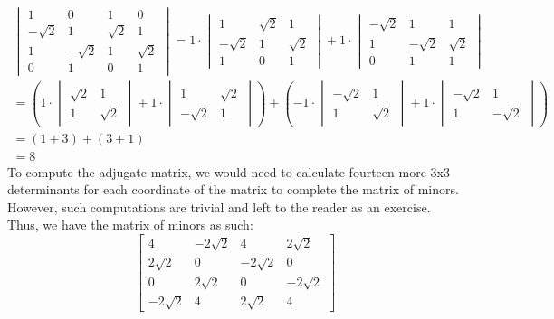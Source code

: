 \documentclass{article}
\theoremstyle{definition}
\begin{document}
\[
\begin{gathered}
\begin{vmatrix}
    1 & 0 & 1 & 0\\
    -\sqrt{2} & 1 & \sqrt{2} & 1\\
    1 & -\sqrt{2} & 1 & \sqrt{2}\\
    0 & 1 & 0 & 1
\end{vmatrix}
= 1\cdot
\begin{vmatrix}
    1 & \sqrt{2} & 1\\
    -\sqrt{2} & 1 & \sqrt{2}\\
    1 & 0 & 1
\end{vmatrix} + 1\cdot
\begin{vmatrix}
    -\sqrt{2} & 1 & 1\\
    1 & -\sqrt{2} &\sqrt{2}\\
    0 & 1 & 1
\end{vmatrix}\\
= \left(1 \cdot \begin{vmatrix}
    \sqrt{2} & 1\\
    1 & \sqrt{2}
\end{vmatrix} + 1\cdot \begin{vmatrix}
    1 & \sqrt{2}\\
    -\sqrt{2} & 1
\end{vmatrix}\right) + \left(-1\cdot\begin{vmatrix}
    -\sqrt{2} & 1\\
    1 & \sqrt{2}
\end{vmatrix} + 1\cdot \begin{vmatrix}
    -\sqrt{2} & 1\\
    1 & -\sqrt{2}
\end{vmatrix}\right)\\
=\left(1+3\right) + \left(3+1\right)\\
=8
\end{gathered}
\]
To compute the adjugate matrix, we would need to calculate fourteen more 3x3 determinants for each
coordinate of the matrix to complete the matrix of minors. However, such computations are trivial
and left to the reader as an exercise. Thus, we have the matrix of minors as such:
\begin{equation*}
\begin{bmatrix}
    4 & -2\sqrt{2} & 4 & 2\sqrt{2}\\
    2\sqrt{2} & 0 & -2\sqrt{2} & 0\\
    0 & 2\sqrt{2} & 0 & -2\sqrt{2}\\
    -2\sqrt{2} & 4 & 2\sqrt{2} & 4
\end{bmatrix}
\end{equation*}
\end{document}
